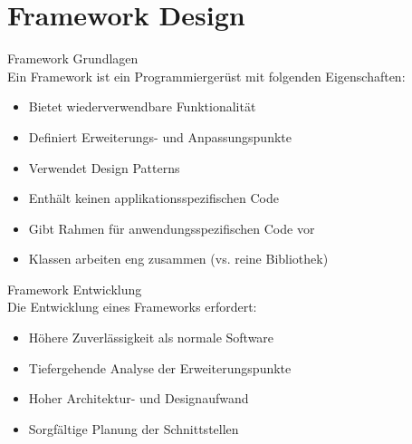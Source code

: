 \section{Framework Design}

\begin{definition}{Framework Grundlagen}\\
Ein Framework ist ein Programmiergerüst mit folgenden Eigenschaften:
\begin{itemize}
    \item Bietet wiederverwendbare Funktionalität
    \item Definiert Erweiterungs- und Anpassungspunkte
    \item Verwendet Design Patterns
    \item Enthält keinen applikationsspezifischen Code
    \item Gibt Rahmen für anwendungsspezifischen Code vor
    \item Klassen arbeiten eng zusammen (vs. reine Bibliothek)
\end{itemize}
\end{definition}

\begin{concept}{Framework Entwicklung}\\
Die Entwicklung eines Frameworks erfordert:
\begin{itemize}
    \item Höhere Zuverlässigkeit als normale Software
    \item Tiefergehende Analyse der Erweiterungspunkte
    \item Hoher Architektur- und Designaufwand
    \item Sorgfältige Planung der Schnittstellen
\end{itemize}
\end{concept}


